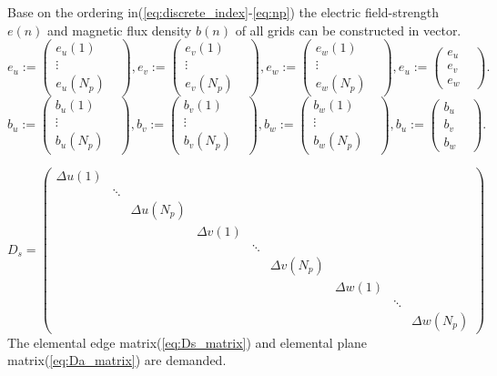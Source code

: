 Base on the ordering in(\ref{eq:discrete_index}-\ref{eq:np}) the electric field-strength $e(n)$ and magnetic flux density $b(n)$ of all grids can be constructed in vector.
\begin{equation}
e_{u}:=
\begin{pmatrix}
e_{u}(1)&\\
\vdots&\\
e_{u}(N_{p})&
\end{pmatrix},
e_{v}:=
\begin{pmatrix}
e_{v}(1)&\\
\vdots&\\
e_{v}(N_{p})&
\end{pmatrix},
e_{w}:=
\begin{pmatrix}
e_{w}(1)&\\
\vdots&\\
e_{w}(N_{p})&
\end{pmatrix},
e_{u}:=
\begin{pmatrix}
e_{u}&\\
e_{v}&\\
e_{w}&
\end{pmatrix}.
\label{eq:vector_e_field}
\end{equation}
\begin{equation}
b_{u}:=
\begin{pmatrix}
b_{u}(1)&\\
\vdots&\\
b_{u}(N_{p})&
\end{pmatrix},
b_{v}:=
\begin{pmatrix}
b_{v}(1)&\\
\vdots&\\
b_{v}(N_{p})&
\end{pmatrix},
b_{w}:=
\begin{pmatrix}
b_{w}(1)&\\
\vdots&\\
b_{w}(N_{p})&
\end{pmatrix},
b_{u}:=
\begin{pmatrix}
b_{u}&\\
b_{v}&\\
b_{w}&
\end{pmatrix}.
\label{eq:vector_m_flux}
\end{equation}

\begin{equation}
D_{s}=
	\begin{pmatrix}
	\Delta u(1)&&&&&&&&\\
	&\ddots &&&&&&&\\
	&&\Delta u(N_{p})&&&&&&\\
	&&&\Delta v(1)&&&&&\\
	&&&&\ddots &&&&\\
	&&&&&\Delta v(N_{p})&&&\\
	&&&&&&\Delta w(1)&&\\
	&&&&&&&\ddots &\\
	&&&&&&&&\Delta w(N_{p})
	\end{pmatrix}
	\label{eq:Ds_matrix}
\end{equation}
The elemental edge matrix(\ref{eq:Ds_matrix}) and elemental plane matrix(\ref{eq:Da_matrix}) are demanded.

